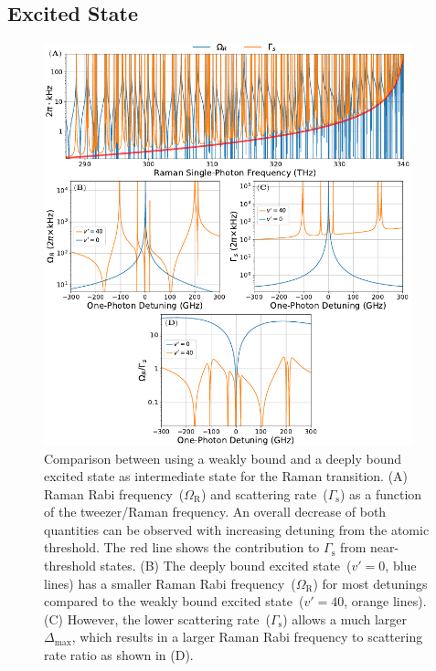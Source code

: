 \subsection{Excited State}
\label{ch:raman-transfer:state-selection:ext}

\begin{figure}
  \centering
  \includegraphics[width=0.95\textwidth]{figures/raman_transfer_theory_ratio_v0_vs_vhi.pdf}
  \caption[Comparison between using a weakly bound and a deeply bound excited state
  as intermediate state for the Raman transition]{
    Comparison between using a weakly bound and a deeply bound excited state
    as intermediate state for the Raman transition.
    (A) Raman Rabi frequency~($\Omega_{\mathrm{R}}$) and
    scattering rate~($\Gamma_{\mathrm{s}}$) as a function of the tweezer/Raman frequency.
    An overall decrease of both quantities can be observed
    with increasing detuning from the atomic threshold.
    The red line shows the contribution to $\Gamma_{\mathrm{s}}$ from near-threshold states.
    (B) The deeply bound excited state~($v'=0$, blue lines) has a smaller
    Raman Rabi frequency~($\Omega_{\mathrm{R}}$) for most detunings compared to the
    weakly bound excited state~($v'=40$, orange lines).
    (C) However, the lower scattering rate~($\Gamma_{\mathrm{s}}$) allows a much larger
    $\Delta_{\max}$, which results in a larger Raman Rabi frequency to scattering rate ratio
    as shown in (D).
    \label{fig:raman-transfer:v0-vs-vhi}}
\end{figure}

